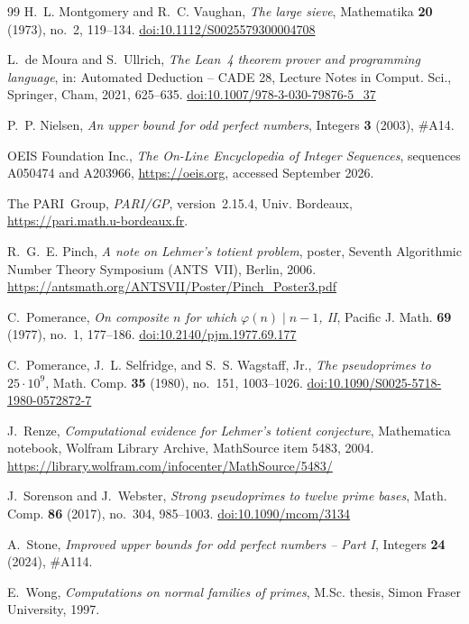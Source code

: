 \documentclass[11pt,reqno]{amsart}
\numberwithin{equation}{section}
\theoremstyle{plain}
\theoremstyle{definition}
\theoremstyle{remark}
\begin{document}
\begin{thebibliography}{99}
H.~L. Montgomery and R.~C. Vaughan,
\emph{The large sieve},
Mathematika \textbf{20} (1973), no.~2, 119--134.
\href{https://doi.org/10.1112/S0025579300004708}{doi:10.1112/S0025579300004708}

L.~de Moura and S.~Ullrich,
\emph{The Lean~4 theorem prover and programming language},
in: Automated Deduction -- CADE 28, Lecture Notes in Comput. Sci.,
Springer, Cham, 2021, 625--635.
\href{https://doi.org/10.1007/978-3-030-79876-5_37}{doi:10.1007/978-3-030-79876-5\_37}

P.~P. Nielsen,
\emph{An upper bound for odd perfect numbers},
Integers \textbf{3} (2003), \#A14.

OEIS Foundation Inc.,
\emph{The On-Line Encyclopedia of Integer Sequences},
sequences A050474 and A203966, \url{https://oeis.org}, accessed
September 2026.

The PARI~Group,
\emph{PARI/GP}, version~2.15.4, Univ. Bordeaux,
\url{https://pari.math.u-bordeaux.fr}.

R.~G.~E. Pinch,
\emph{A note on Lehmer's totient problem},
poster, Seventh Algorithmic Number Theory Symposium (ANTS~VII), Berlin, 2006.
\url{https://antsmath.org/ANTSVII/Poster/Pinch_Poster3.pdf}

C.~Pomerance,
\emph{On composite $n$ for which $\varphi(n)\mid n-1$, II},
Pacific J. Math. \textbf{69} (1977), no.~1, 177--186.
\href{https://doi.org/10.2140/pjm.1977.69.177}{doi:10.2140/pjm.1977.69.177}

C.~Pomerance, J.~L. Selfridge, and S.~S. Wagstaff, Jr.,
\emph{The pseudoprimes to $25\cdot10^9$},
Math. Comp. \textbf{35} (1980), no.~151, 1003--1026.
\href{https://doi.org/10.1090/S0025-5718-1980-0572872-7}{doi:10.1090/S0025-5718-1980-0572872-7}

J.~Renze,
\emph{Computational evidence for Lehmer's totient conjecture},
Mathematica notebook, Wolfram Library Archive, MathSource item 5483, 2004.
\url{https://library.wolfram.com/infocenter/MathSource/5483/}

J.~Sorenson and J.~Webster,
\emph{Strong pseudoprimes to twelve prime bases},
Math. Comp. \textbf{86} (2017), no.~304, 985--1003.
\href{https://doi.org/10.1090/mcom/3134}{doi:10.1090/mcom/3134}

A.~Stone,
\emph{Improved upper bounds for odd perfect numbers -- Part I},
Integers \textbf{24} (2024), \#A114.

E.~Wong,
\emph{Computations on normal families of primes},
M.Sc. thesis, Simon Fraser University, 1997.

\end{thebibliography}
\end{document}
